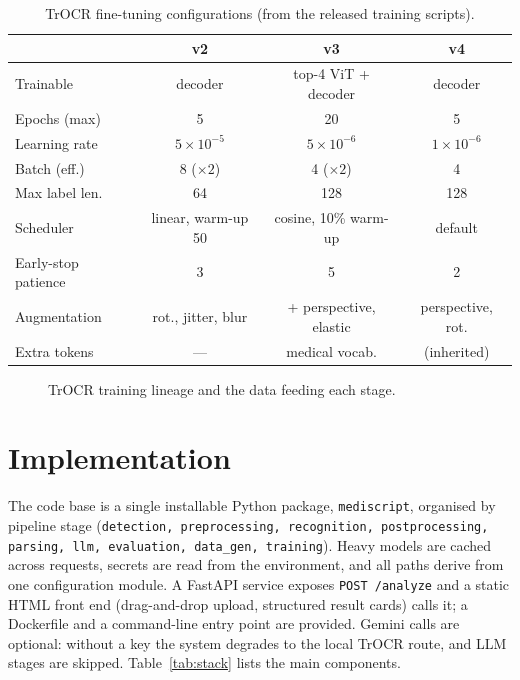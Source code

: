 \documentclass[journal]{IEEEtran}
\begin{document}
\begin{table}[t]
\centering
\caption{TrOCR fine-tuning configurations (from the released training scripts).}
\label{tab:hyper}
\small
\setlength{\tabcolsep}{3pt}
\begin{tabular}{lccc}
\toprule
 & \textbf{v2} & \textbf{v3} & \textbf{v4} \\
\midrule
Trainable & decoder & top-4 ViT + decoder & decoder \\
Epochs (max) & 5 & 20 & 5 \\
Learning rate & $5{\times}10^{-5}$ & $5{\times}10^{-6}$ & $1{\times}10^{-6}$ \\
Batch (eff.) & 8 ($\times2$) & 4 ($\times2$) & 4 \\
Max label len. & 64 & 128 & 128 \\
Scheduler & linear, warm-up 50 & cosine, 10\% warm-up & default \\
Early-stop patience & 3 & 5 & 2 \\
Augmentation & rot., jitter, blur & + perspective, elastic & perspective, rot. \\
Extra tokens & --- & medical vocab. & (inherited) \\
\bottomrule
\end{tabular}
\end{table}

\begin{figure}[t]
\centering
\resizebox{0.95\textwidth}{!}{}
\caption{TrOCR training lineage and the data feeding each stage.}
\label{fig:training}
\end{figure}

\section{Implementation}\label{sec:impl}
The code base is a single installable Python package, \texttt{mediscript}, organised by pipeline stage (\texttt{detection, preprocessing, recognition, postprocessing, parsing, llm, evaluation, data\_gen, training}). Heavy models are cached across requests, secrets are read from the environment, and all paths derive from one configuration module. A FastAPI service exposes \texttt{POST /analyze} and a static HTML front end (drag-and-drop upload, structured result cards) calls it; a Dockerfile and a command-line entry point are provided. Gemini calls are optional: without a key the system degrades to the local TrOCR route, and LLM stages are skipped. Table~\ref{tab:stack} lists the main components.
\end{document}
